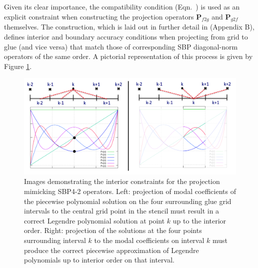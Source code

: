 Given its clear importance, the compatibility condition (Eqn.~) is used as an explicit
constraint when constructing the projection operators $\pmb{P}_{f2g}$ and $\pmb{P}_{g2f}$
themselves. The construction, which is laid out in further detail in \cite{kozdon2016stable} (Appendix B),
defines interior and boundary accuracy conditions when projecting from grid to glue
(and vice versa) that match those of corresponding SBP diagonal-norm operators of the
same order. A pictorial representation of this process is given by Figure \ref{fig:projection_layout}.
\begin{figure}
\centering
\includegraphics[width=0.9\linewidth,trim=4 4 4 4,clip]{figures/projection_layout.png}
\caption{Images demonstrating the interior constraints for the projection mimicking SBP4-2
	 operators. Left: projection of modal coefficients of the piecewise polynomial solution
	 on the four surrounding glue grid intervals to the central grid point in the stencil must
	 result in a correct Legendre polynomial solution at point $k$ up to the interior order.
	 Right: projection of the solutions at the four points surrounding interval $k$ to the
	 modal coefficients on interval $k$ must produce the correct piecewise approximation of
	 Legendre polynomials up to interior order on that interval.}
\label{fig:projection_layout}
\end{figure}
